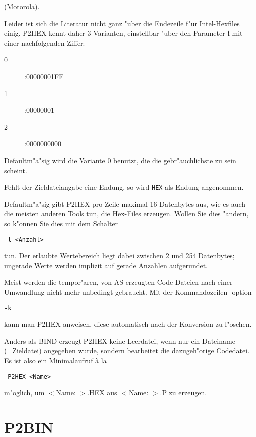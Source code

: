 \documentclass[12pt,a4paper,twoside]{report}
\newcommand{\bb}[1]{{\bf #1}}
\newcommand{\tty}[1]{{\tt #1}}
\begin{document}
(Motorola).
\par
Leider ist sich die Literatur nicht ganz "uber die Endezeile f"ur
Intel-Hexfiles einig.  P2HEX kennt daher 3 Varianten, einstellbar "uber
den Parameter \bb{i} mit einer nachfolgenden Ziffer:
\begin{description}
\item[0]{ :00000001FF}
\item[1]{ :00000001}
\item[2]{ :0000000000}
\end{description}
\par
Defaultm"a"sig wird die Variante 0 benutzt, die die gebr"auchlichste zu
sein scheint.
\par
Fehlt der Zieldateiangabe eine Endung, so wird \tty{HEX} als Endung angenommen.
\par
Defaultm"a"sig gibt P2HEX pro Zeile maximal 16 Datenbytes aus, wie es
auch die meisten anderen Tools tun, die Hex-Files erzeugen.  Wollen
Sie dies "andern, so k"onnen Sie dies mit dem Schalter
\begin{verbatim}
-l <Anzahl>
\end{verbatim}
tun.  Der erlaubte Wertebereich liegt dabei zwischen 2 und 254 Datenbytes;
ungerade Werte werden implizit auf gerade Anzahlen aufgerundet.
\par
Meist werden die tempor"aren, von AS erzeugten Code-Dateien nach einer
Umwandlung nicht mehr unbedingt gebraucht.  Mit der Kommandozeilen-
option
\begin{verbatim}
-k
\end{verbatim}
kann man P2HEX anweisen, diese automatisch nach der Konversion zu l"oschen.
\par
Anders als BIND erzeugt P2HEX keine Leerdatei, wenn nur ein Dateiname
(=Zieldatei) angegeben wurde, sondern bearbeitet die dazugeh"orige
Codedatei.  Es ist also ein Minimalaufruf \`a la
\begin{verbatim}
 P2HEX <Name>
\end{verbatim}
m"oglich, um $<$Name:  $>$.HEX aus $<$Name:  $>$.P zu erzeugen.


\section{P2BIN}
\end{document}
